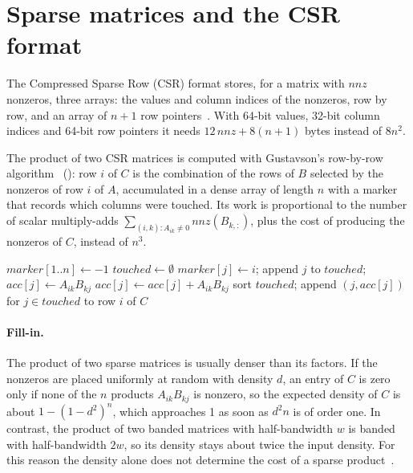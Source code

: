 \documentclass[12pt,a4paper]{report}
\begin{document}
\section{Sparse matrices and the CSR format}

The Compressed Sparse Row (CSR) format stores, for a matrix with $\mathit{nnz}$ nonzeros, three arrays: the values
and column indices of the nonzeros, row by row, and an array of $n+1$ row pointers~\cite{saad2003,davis2006}. With
64-bit values, 32-bit column indices and 64-bit row pointers it needs $12\,\mathit{nnz} + 8(n+1)$ bytes instead of
$8n^2$.

The product of two CSR matrices is computed with Gustavson's row-by-row algorithm~\cite{gustavson1978}
(): row $i$ of $C$ is the combination of the rows of $B$ selected by the nonzeros of row $i$ of
$A$, accumulated in a dense array of length $n$ with a marker that records which columns were touched. Its work is
proportional to the number of scalar multiply-adds $\sum_{(i,k):A_{ik}\neq 0} \mathit{nnz}(B_{k,:})$, plus the cost
of producing the nonzeros of $C$, instead of $n^3$.

\begin{algorithm}[H]
\caption{Gustavson's CSR $\times$ CSR product with a dense accumulator}
\label{alg:gustavson}
\begin{algorithmic}[1]
\State $\mathit{marker}[1..n] \gets -1$
  \State $\mathit{touched} \gets \emptyset$
        \State $\mathit{marker}[j] \gets i$; append $j$ to $\mathit{touched}$; $\mathit{acc}[j] \gets A_{ik} B_{kj}$
      \Else
        \State $\mathit{acc}[j] \gets \mathit{acc}[j] + A_{ik} B_{kj}$
      \EndIf
    \EndFor
  \EndFor
  \State sort $\mathit{touched}$; append $(j, \mathit{acc}[j])$ for $j \in \mathit{touched}$ to row $i$ of $C$
\EndFor
\end{algorithmic}
\end{algorithm}

\paragraph{Fill-in.} The product of two sparse matrices is usually denser than its factors. If the nonzeros are placed
uniformly at random with density $d$, an entry of $C$ is zero only if none of the $n$ products $A_{ik}B_{kj}$ is
nonzero, so the expected density of $C$ is about $1 - (1 - d^2)^n$, which approaches 1 as soon as $d^2 n$ is of order
one. In contrast, the product of two banded matrices with half-bandwidth $w$ is banded with half-bandwidth $2w$, so its
density stays about twice the input density. For this reason the density alone does not determine the cost of a sparse
product~\cite{davis2006}.
\end{document}
